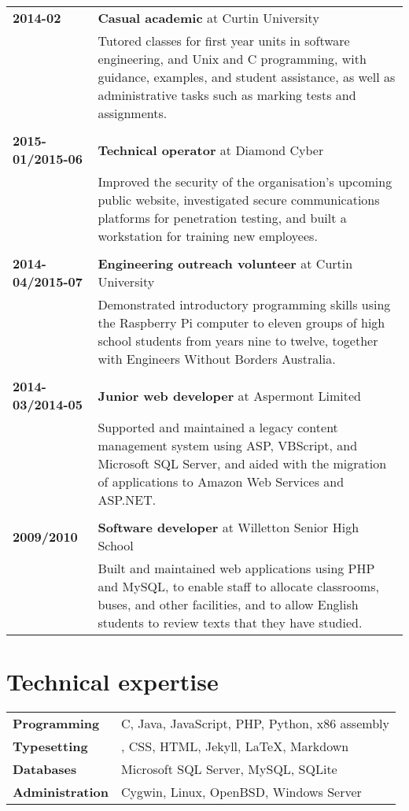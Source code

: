 \documentclass[a4paper,12pt]{article}
\begin{document}
\begin{tabular}{p{3.5cm}p{12.5cm}}
	\textbf{2014-02} &
		\textbf{Casual academic} at Curtin University\\ &
		Tutored classes for first year units in software engineering,
		and Unix and C programming, with guidance, examples, and
		student assistance, as well as administrative tasks such as
		marking tests and assignments.\\\\
	\textbf{2015-01/2015-06} &
		\textbf{Technical operator} at Diamond Cyber\\ &
		Improved the security of the organisation's upcoming public
		website, investigated secure communications platforms for
		penetration testing, and built a workstation for training new
		employees.\\\\
	\textbf{2014-04/2015-07} &
		\textbf{Engineering outreach volunteer} at Curtin University\\ &
		Demonstrated introductory programming skills using the
		Raspberry Pi computer to eleven groups of high school students
		from years nine to twelve, together with Engineers Without
		Borders Australia.\\\\
	\textbf{2014-03/2014-05} &
		\textbf{Junior web developer} at Aspermont Limited\\ &
		Supported and maintained a legacy content management system
		using ASP, VBScript, and Microsoft SQL Server, and aided
		with the migration of applications to Amazon Web Services and
		ASP.NET.\\\\
	\textbf{2009/2010} &
		\textbf{Software developer} at Willetton Senior High School\\ &
		Built and maintained web applications using PHP and MySQL, to
		enable staff to allocate classrooms, buses, and other
		facilities, and to allow English students to review texts that
		they have studied.\\
\end{tabular}

\section*{Technical expertise}

\begin{tabular}{p{3.5cm}p{12.5cm}}
	\textbf{Programming} &
		C, Java, JavaScript, PHP, Python, x86 assembly \\
	\textbf{Typesetting} &
		\hologo{BibTeX}, CSS, HTML, Jekyll, \LaTeX, Markdown \\
	\textbf{Databases} &
		Microsoft SQL Server, MySQL, SQLite \\
	\textbf{Administration} &
		Cygwin, Linux, OpenBSD, Windows Server
\end{tabular}
\end{document}
